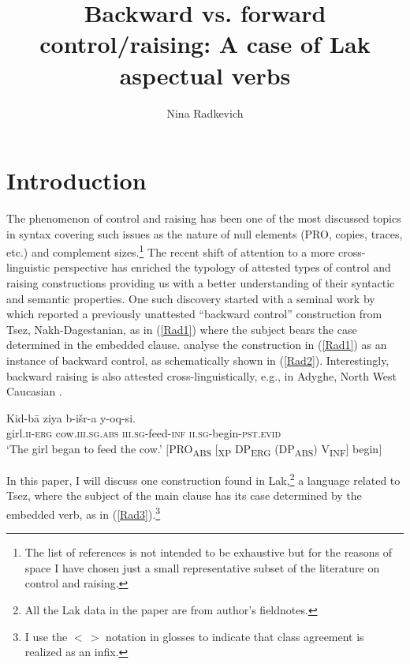 \documentclass[output=paper]{langscibook}
\author{Nina Radkevich\affiliation{University of York}}
\title{Backward vs. forward control/raising: A case of Lak aspectual verbs}
\begin{document}
\maketitle

\section{Introduction}
The phenomenon of control and raising has been one of the most discussed topics in syntax \citep{hornstein1999,Landau2001,Landau2003,Landau2004,martin2001,BoeckxHornstein2003,BoeckxHornstein2004,DaviesDubinsky2004,Wurmbrand1999,wurmbrand2001,Wurmbrand2007} covering such issues as the nature of null elements (PRO, copies, traces, etc.) and complement sizes.\footnote{The list of references is not intended to be exhaustive but for the reasons of space I have chosen just a small representative subset of the literature on control and raising.} The recent shift of attention to a more cross-linguistic perspective  has enriched the typology of attested types of control and raising constructions providing us with a better understanding of their syntactic and semantic properties. One such discovery started with a seminal work by \citet{PolinskyPotsdam2002} which reported a previously unattested “backward control” construction from Tsez, Nakh-Dagestanian, as in (\ref{Rad1}) where the subject bears the case determined in the embedded clause. \citet{PolinskyPotsdam2002} analyse the construction in (\ref{Rad1}) as an instance of backward control, as schematically shown in (\ref{Rad2}). Interestingly, backward raising is also attested cross-linguistically, e.g., in Adyghe, North West Caucasian \citep{PotsdamPolinsky2012}.  

\ea\label{Rad1}
\gll Kid-bā ziya b-išr-a y-oq-si. \\
girl.\textsc{ii-erg} 		cow\textsc{.iii.sg.abs} 	\textsc{iii.sg}-feed-\textsc{inf} \textsc{ii.sg}-begin-\textsc{pst.evid}\\
\glt ‘The girl began to feed the cow.’    \citep[248]{PolinskyPotsdam2002}
\ex\label{Rad2}
$[$PRO\textsubscript{ABS}  $[$\textsubscript{XP} DP\textsubscript{ERG}  (DP\textsubscript{ABS})  V\textsubscript{INF}$]$  begin$]$\\
\z


In this paper, I will discuss one construction found in Lak,\footnote{All the Lak data in the paper are from author's fieldnotes.} a language related to Tsez, where the subject of the main clause has its case determined by the embedded verb, as in (\ref{Rad3}).\footnote{I use the $<\,>$ notation in glosses to indicate that class agreement is realized as an infix.} 
\end{document}
